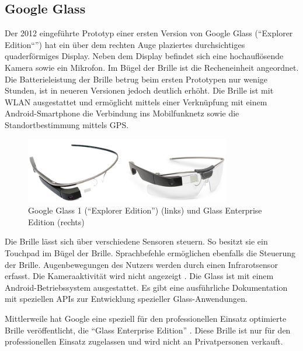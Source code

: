 \subsection{Google Glass}
Der 2012 eingeführte Prototyp einer ersten Version von Google Glass (\enquote{Explorer Edition“}) hat ein über dem rechten Auge plaziertes durchsichtiges quaderförmiges Display. Neben dem Display befindet sich eine hochauflösende Kamera sowie ein Mikrofon. Im Bügel der Brille ist die Recheneinheit angeordnet. Die Batterieleistung der Brille betrug beim ersten Prototypen nur wenige Stunden, ist in neueren Versionen jedoch deutlich erhöht. Die Brille ist mit WLAN ausgestattet und ermöglicht mittels einer Verknüpfung mit einem Android-Smartphone die Verbindung ins Mobilfunknetz sowie die Standortbestimmung mittels GPS.
%
\begin{figure}[htbp]
    \centering
    \includegraphics[width=0.8\textwidth]{data/bilder/Glass_1_und_2.png}
    \caption{Google Glass 1 (\enquote{Explorer Edition}) \cite{Reckmann2014a} (links) und Glass Enterprise Edition \cite{Huvelin2017} (rechts)}
    \label{fig:GlassModel}
\end{figure}
%

Die Brille lässt sich über verschiedene Sensoren steuern. So besitzt sie ein Touchpad im Bügel der Brille. Sprachbefehle ermöglichen ebenfalls die Steuerung der Brille. Augenbewegungen des Nutzers werden durch einen Infrarotsensor erfasst. Die Kameraaktivität wird nicht angezeigt \cite[S.~30]{Schwenke2016}. Die Glass ist mit einem Android-Betriebssystem ausgestattet. Es gibt eine ausführliche Dokumentation mit speziellen APIs zur Entwicklung spezieller Glass-Anwendungen.

Mittlerweile hat Google eine speziell für den professionellen Einsatz optimierte Brille veröffentlicht, die \enquote{Glass Enterprise Edition} \cite{Inc.2018}. Diese Brille ist nur für den professionellen Einsatz zugelassen und wird nicht an Privatpersonen verkauft.
%
